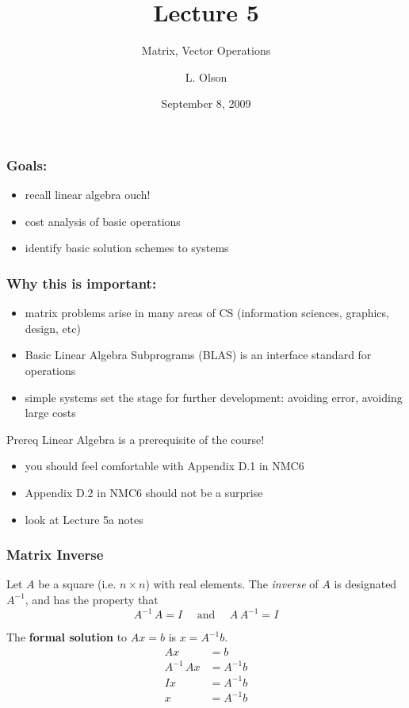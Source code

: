 \documentclass[10pt]{beamer}
\author{L. Olson}
\institute[UIUC]
{Department of Computer Science\\
University of Illinois at Urbana-Champaign\\
\vspace{0.5cm}
}
\title[CS 357]{Lecture 5}
\subtitle{Matrix, Vector Operations}
\date{September 8, 2009}
\newcommand{\matdim}[2]{\ensuremath{#1\times#2}}
\begin{document}
\begin{frame}
  \titlepage
\end{frame}
\begin{frame}
\frametitle{Goals:}
\begin{itemize}
  \item recall linear algebra {\tiny{ouch!}}
  \item cost analysis of basic operations
  \item identify basic solution schemes to systems
\end{itemize}
\end{frame}
\begin{frame}
\frametitle{Why this is important:}
\begin{itemize} 
  \item matrix problems arise in many areas of CS (information sciences,
graphics, design, etc)
  \item Basic Linear Algebra Subprograms (BLAS) is an interface standard for
operations
  \item simple systems set the stage for further development: avoiding error,
avoiding large costs
\end{itemize}
\end{frame}
\begin{frame}
  \begin{alertblock}{Prereq}
    Linear Algebra is a prerequisite of the course!
  \end{alertblock}
  \begin{itemize}
  \item you should feel comfortable with Appendix D.1 in NMC6
  \item Appendix D.2 in NMC6 should not be a surprise
  \item look at Lecture 5a notes
  \end{itemize}
\end{frame}
\begin{frame}
\frametitle{Matrix Inverse}

Let $A$ be a square (i.e. \matdim{n}{n}) with real elements.  The
\emph{inverse} of $A$ is designated $A^{-1}$, and has the property that
\begin{equation*}
    A^{-1}\, A = I
    \ \ \ \ \ \ \text{and} \ \ \ \ \ \
    A\, A^{-1} = I
\end{equation*}

The \textbf{formal solution} to $Ax=b$ is $x=A^{-1}b$.
\begin{align*}
              Ax &= b     \\
    A^{-1}\, A x &= A^{-1}b  \\
              Ix &= A^{-1}b   \\
               x &= A^{-1}b
\end{align*}

\end{frame}
\end{document}
